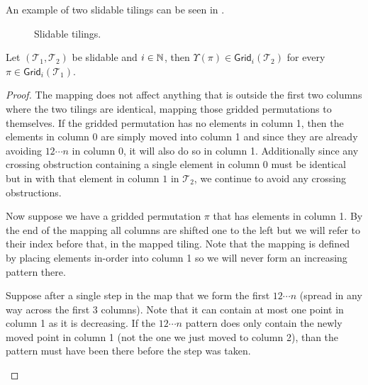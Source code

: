 An example of two slidable tilings can be seen in .

\begin{figure}[ht]
    \centering
    
    \caption{Slidable tilings.}
    \label{fig:slidable_tilings}
\end{figure}

\begin{lemma}\label{lem:slidemap}
Let $(\mathcal{T}_1,\mathcal{T}_2)$ be slidable and $i \in \mathbb{N}$, then $\Upsilon(\pi) \in \textsf{Grid}_i(\mathcal{T}_2)$ for every $\pi \in \textsf{Grid}_i(\mathcal{T}_1)$.
\end{lemma}
\begin{proof}
The mapping does not affect anything that is outside the first two columns where the two tilings are identical, mapping those gridded permutations to themselves. If the gridded permutation has no elements in column 1, then the elements in column $0$ are simply moved into column 1 and since they are already avoiding $12\cdots n$ in column 0, it will also do so in column 1. Additionally since any crossing obstruction containing a single element in column $0$ must be identical but in with that element in column $1$ in $\mathcal{T}_2$, we continue to avoid any crossing obstructions.

Now suppose we have a gridded permutation $\pi$ that has elements in column 1. By the end of the mapping all columns are shifted one to the left but we will refer to their index before that, in the mapped tiling. Note that the mapping is defined by placing elements in-order into column 1 so we will never form an increasing pattern there.

Suppose after a single step in the map that we form the first $12\cdots n$ (spread in any way across the first 3 columns). Note that it can contain at most one point in column 1 as it is decreasing. If the $12\cdots n$ pattern does only contain the newly moved point in column 1 (not the one we just moved to column 2), than the pattern must have been there before the step was taken.

\begin{center}
\end{center}


\end{proof}
